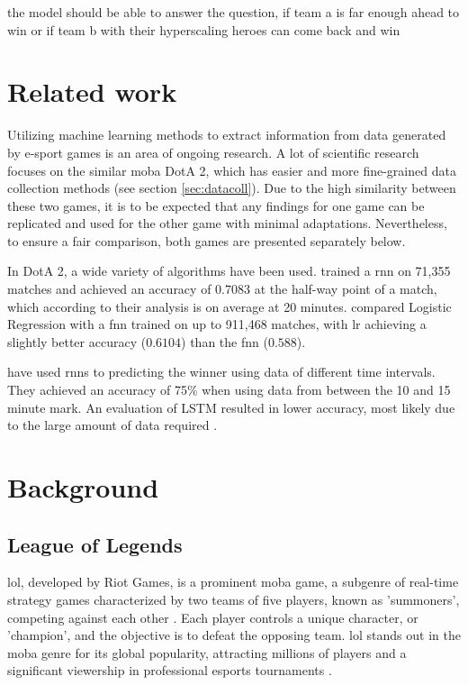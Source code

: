 \documentclass[12pt, a4paper, headinclude, twoside, plainheadsepline, open=right, numbers=noenddot, hidelinks, toc=listof, toc=bibliography]{scrreprt}
\begin{document}
the model should be able to answer the question, if team a is far enough ahead to win or if team b with their hyperscaling heroes can come back and win


\chapter{Related work}
\label{chap:related}

Utilizing machine learning methods to extract information from data generated by e-sport games is an area of ongoing research.
A lot of scientific research focuses on the similar \ac{moba} DotA 2, which has easier and more fine-grained data collection methods (see section \ref{sec:datacoll}).
Due to the high similarity between these two games, it is to be expected that any findings for one game can be replicated and used for the other game with minimal adaptations.
Nevertheless, to ensure a fair comparison, both games are presented separately below.

In DotA 2, a wide variety of algorithms have been used.  
 \cite{yuMOBASliceTimeSlice2018} trained a \ac{rnn} on 71,355 matches and achieved an accuracy of $0.7083$ at the half-way point of a match, which according to their analysis is on average at 20 minutes.
 \cite{wangPredictingMultiplayerOnline2016} compared Logistic Regression with a \ac{fnn} trained on up to 911,468 matches, with \ac{lr} achieving a slightly better accuracy ($0.6104$) than the \ac{fnn} ($0.588$).


 have used \acp{rnn} to predicting the winner using data of different time intervals. They achieved an accuracy of 75\% when using data from between the 10 and 15 minute mark.
An evaluation of LSTM resulted in lower accuracy, most likely due to the large amount of data required \cite{silvaContinuousOutcomePrediction2018}.

\chapter{Background}
\label{chap:background}

\section{League of Legends}
\label{sec:LoL}

\ac{lol}, developed by Riot Games, is a prominent \ac{moba} game, a subgenre of real-time strategy games characterized by two teams of five players, known as 'summoners', competing against each other \cite{mora-cantallopsMOBAGamesLiterature2018}. 
Each player controls a unique character, or 'champion', and the objective is to defeat the opposing team. 
\Ac{lol} stands out in the \ac{moba} genre for its global popularity, attracting millions of players and a significant viewership in professional esports tournaments \cite{goughLeagueLegendsChampionships}.
\end{document}
